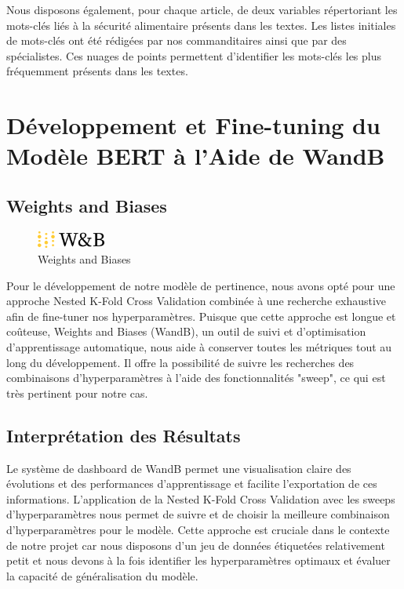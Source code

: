 \documentclass{article}
\begin{document}
Nous disposons également, pour chaque article, de deux variables répertoriant les mots-clés liés à la sécurité alimentaire présents dans les textes. Les listes initiales de mots-clés ont été rédigées par nos commanditaires ainsi que par des spécialistes. Ces nuages de points permettent d'identifier les mots-clés les plus fréquemment présents dans les textes.

\section{Développement et Fine-tuning du Modèle BERT à l'Aide de WandB}

\subsection{Weights and Biases}

\begin{figure} %
  \centering
  \includegraphics[width=0.2\textwidth]{image.png}
  \caption{\small Weights and Biases}
  \label{fig:Weights and Biases}
\end{figure}

Pour le développement de notre modèle de pertinence, nous avons opté pour une approche Nested K-Fold Cross Validation combinée à une recherche exhaustive afin de fine-tuner nos hyperparamètres. Puisque que cette approche est longue et coûteuse, Weights and Biases (WandB), un outil de suivi et d'optimisation d'apprentissage automatique, nous aide à conserver toutes les métriques tout au long du développement. Il offre la possibilité de suivre les recherches des combinaisons d'hyperparamètres à l'aide des fonctionnalités "sweep", ce qui est très pertinent pour notre cas.

\subsection{Interprétation des Résultats}

Le système de dashboard de WandB permet une visualisation claire des évolutions et des performances d'apprentissage et facilite l'exportation de ces informations. L'application de la Nested K-Fold Cross Validation avec les sweeps d'hyperparamètres nous permet de suivre et de choisir la meilleure combinaison d'hyperparamètres pour le modèle. Cette approche est cruciale dans le contexte de notre projet car nous disposons d'un jeu de données étiquetées relativement petit et nous devons à la fois identifier les hyperparamètres optimaux et évaluer la capacité de généralisation du modèle.
\end{document}
